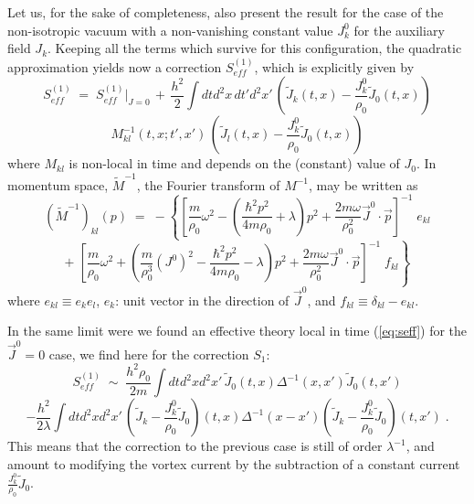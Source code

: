 \documentclass[a4paper,12pt]{article} \tolerance=200
\begin{document}
Let us, for the sake of completeness, also present the result for the
case of the non-isotropic vacuum with a non-vanishing constant value
$J^0_k$ for the auxiliary field $J_k$. Keeping all the terms which
survive for this configuration, the quadratic approximation yields now
a correction $S^{(1)}_{eff}$, which is explicitly given by
$$
S^{(1)}_{eff}\;=\;  S^{(1)}_{eff}|_{J=0} \,+\, 
\frac{h^2}{2} \int dtd^2x \, dt'd^2x'\,
({\tilde J}_k(t,x) - \frac{J^0_k}{\rho_0} {\tilde J}_0(t,x))
$$
\begin{equation}\label{eq:s4eff}
M^{-1}_{kl}(t,x;t',x')\,({\tilde J}_l(t,x) - \frac{J^0_k}{\rho_0} {\tilde J}_0(t,x))
\end{equation}
where $M_{kl}$ is non-local in time and depends on the (constant)
value of $J_0$.  In momentum space, ${\tilde M}^{-1}$, the Fourier
transform of $M^{-1}$, may be written as
$$
({\tilde M}^{-1})_{kl} (p) \;=\; - \left\{ [ \frac{m}{\rho_0} \omega^2 -
  (\frac{\hbar^2 p^2}{4 m \rho_0} + \lambda) p^2 + \frac {2 m \omega}{\rho_0^2} {\vec J}^0
  \cdot {\vec p} ]^{-1} \; e_{kl} \right.
$$
\begin{equation}
\left. +\; [ \frac{m}{\rho_0} \omega^2 + (\frac{m}{\rho_0^3} (J^0)^2 - \frac{\hbar^2 p^2}{4 m \rho_0} - \lambda) p^2 
+ \frac {2 m \omega}{\rho_0^2} {\vec J}^0 \cdot {\vec p} ]^{-1} \; f_{kl} \right\}
\end{equation}
where $e_{kl} \equiv e_k e_l$, $e_k$: unit vector in the direction of ${\vec J}^0$, and 
$f_{kl} \equiv \delta_{kl} - e_{kl}$.

In the same limit were we found an effective theory local in time
(\ref{eq:seff}) for the ${\vec J}^0 = 0$ case, we find here for the
correction $S_1$:
$$
S^{(1)}_{eff} \;\sim\;\frac{h^2\rho_0}{2 m} \int dt d^2x d^2x'\,{\tilde
  J}_0(t,x) \Delta^{-1}(x,x') {\tilde J}_0(t,x')
$$
\begin{equation}\label{eq:seffj}
- \frac{h^2}{2 \lambda} \int dt d^2x  d^2x'\, ({\tilde J}_k - \frac{J^0_k}{\rho_0} {\tilde J}_0) (t,x) \Delta^{-1}(x-x')
({\tilde J}_k - \frac{J^0_k}{\rho_0} {\tilde J}_0) (t,x')\;.
\end{equation}
This means that the correction to the previous case is still of order
$\lambda^{-1}$, and amount to modifying the vortex current by the
subtraction of a constant current $\frac{J^0_k}{\rho_0} {\tilde J}_0$.
\end{document}
